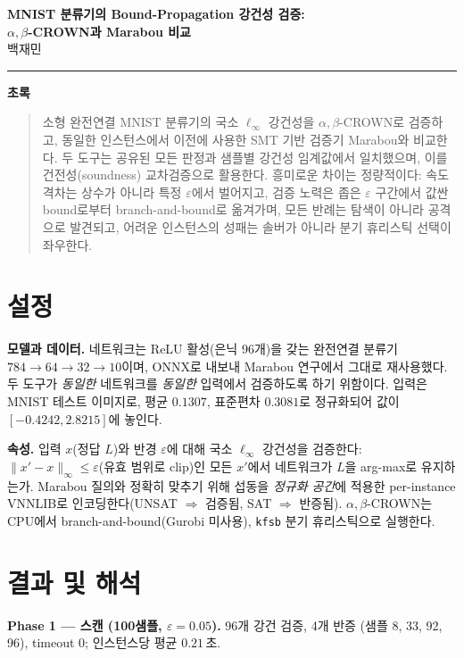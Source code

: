 \documentclass[10pt]{article}
\newcommand{\abc}{$\alpha,\beta$-CROWN}
\newcommand{\linf}{$\ell_\infty$}
\newcommand{\eps}{$\varepsilon$}
\begin{document}
\begin{center}
  {\LARGE\bfseries MNIST 분류기의 Bound-Propagation 강건성 검증:\\[2pt]
   $\alpha,\beta$-CROWN과 Marabou 비교}\\[10pt]
  {\normalsize 백재민}\\[2pt]
  \rule{\textwidth}{0.4pt}
\end{center}

\begin{center}\textbf{초록}\end{center}
\begin{quote}\small
소형 완전연결 MNIST 분류기의 국소 \linf{} 강건성을 \abc{}로 검증하고, 동일한 인스턴스에서
이전에 사용한 SMT 기반 검증기 Marabou와 비교한다. 두 도구는 공유된 모든 판정과 샘플별
강건성 임계값에서 일치했으며, 이를 건전성(soundness) 교차검증으로 활용한다. 흥미로운 차이는
정량적이다: 속도 격차는 상수가 아니라 특정 \eps{}에서 벌어지고, 검증 노력은 좁은 \eps{}
구간에서 값싼 bound로부터 branch-and-bound로 옮겨가며, 모든 반례는 탐색이 아니라 공격으로
발견되고, 어려운 인스턴스의 성패는 솔버가 아니라 분기 휴리스틱 선택이 좌우한다.
\end{quote}

\section{설정}
\textbf{모델과 데이터.} 네트워크는 ReLU 활성(은닉 96개)을 갖는 완전연결 분류기
$784\!\to\!64\!\to\!32\!\to\!10$이며, ONNX로 내보내 Marabou 연구에서 그대로 재사용했다.
두 도구가 \emph{동일한} 네트워크를 \emph{동일한} 입력에서 검증하도록 하기 위함이다. 입력은
MNIST 테스트 이미지로, 평균 $0.1307$, 표준편차 $0.3081$로 정규화되어 값이
$[-0.4242, 2.8215]$에 놓인다.

\textbf{속성.} 입력 $x$(정답 $L$)와 반경 \eps{}에 대해 국소 \linf{} 강건성을 검증한다:
$\lVert x'-x\rVert_\infty \le \varepsilon$(유효 범위로 clip)인 모든 $x'$에서 네트워크가 $L$을
arg-max로 유지하는가. Marabou 질의와 정확히 맞추기 위해 섭동을 \emph{정규화 공간}에 적용한
per-instance VNNLIB로 인코딩한다(UNSAT $\Rightarrow$ 검증됨, SAT $\Rightarrow$ 반증됨). \abc{}는
CPU에서 branch-and-bound(Gurobi 미사용), \texttt{kfsb} 분기 휴리스틱으로 실행한다.

\section{결과 및 해석}
\textbf{Phase 1 --- 스캔 (100샘플, $\varepsilon=0.05$).} 96개 강건 검증, 4개 반증
(샘플 8, 33, 92, 96), timeout 0; 인스턴스당 평균 $0.21$\,초.
\end{document}
